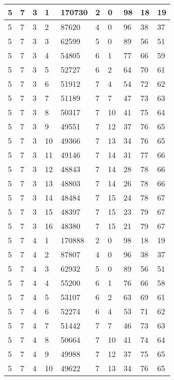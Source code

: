 \begin{table}[!ht]
\begin{tabular}{|l|l|l|l|l|l|l|l|l|l|}
        5 & 7 & 3 & 1 & 170730 & 2 & 0 & 98 & 18 & 19 \\ \hline
        5 & 7 & 3 & 2 & 87620 & 4 & 0 & 96 & 38 & 37 \\ \hline
        5 & 7 & 3 & 3 & 62599 & 5 & 0 & 89 & 56 & 51 \\ \hline
        5 & 7 & 3 & 4 & 54805 & 6 & 1 & 77 & 66 & 59 \\ \hline
        5 & 7 & 3 & 5 & 52727 & 6 & 2 & 64 & 70 & 61 \\ \hline
        5 & 7 & 3 & 6 & 51912 & 7 & 4 & 54 & 72 & 62 \\ \hline
        5 & 7 & 3 & 7 & 51189 & 7 & 7 & 47 & 73 & 63 \\ \hline
        5 & 7 & 3 & 8 & 50317 & 7 & 10 & 41 & 75 & 64 \\ \hline
        5 & 7 & 3 & 9 & 49551 & 7 & 12 & 37 & 76 & 65 \\ \hline
        5 & 7 & 3 & 10 & 49366 & 7 & 13 & 34 & 76 & 65 \\ \hline
        5 & 7 & 3 & 11 & 49146 & 7 & 14 & 31 & 77 & 66 \\ \hline
        5 & 7 & 3 & 12 & 48843 & 7 & 14 & 28 & 78 & 66 \\ \hline
        5 & 7 & 3 & 13 & 48803 & 7 & 14 & 26 & 78 & 66 \\ \hline
        5 & 7 & 3 & 14 & 48484 & 7 & 15 & 24 & 78 & 67 \\ \hline
        5 & 7 & 3 & 15 & 48397 & 7 & 15 & 23 & 79 & 67 \\ \hline
        5 & 7 & 3 & 16 & 48380 & 7 & 15 & 21 & 79 & 67 \\ \hline
        5 & 7 & 4 & 1 & 170888 & 2 & 0 & 98 & 18 & 19 \\ \hline
        5 & 7 & 4 & 2 & 87807 & 4 & 0 & 96 & 38 & 37 \\ \hline
        5 & 7 & 4 & 3 & 62932 & 5 & 0 & 89 & 56 & 51 \\ \hline
        5 & 7 & 4 & 4 & 55200 & 6 & 1 & 76 & 66 & 58 \\ \hline
        5 & 7 & 4 & 5 & 53107 & 6 & 2 & 63 & 69 & 61 \\ \hline
        5 & 7 & 4 & 6 & 52274 & 6 & 4 & 53 & 71 & 62 \\ \hline
        5 & 7 & 4 & 7 & 51442 & 7 & 7 & 46 & 73 & 63 \\ \hline
        5 & 7 & 4 & 8 & 50664 & 7 & 10 & 41 & 74 & 64 \\ \hline
        5 & 7 & 4 & 9 & 49988 & 7 & 12 & 37 & 75 & 65 \\ \hline
        5 & 7 & 4 & 10 & 49622 & 7 & 13 & 34 & 76 & 65 \\ \hline

\end{tabular}
\end{table}
